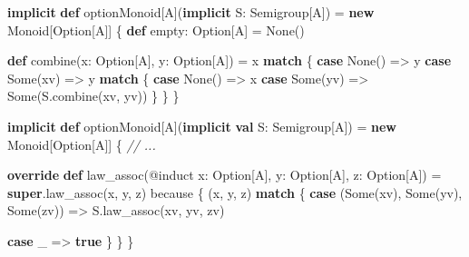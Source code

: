 \documentclass[
  ignorenonframetext,
]{beamer}
\newenvironment{Shaded}{}{}
\newcommand{\CommentTok}[1]{\textcolor[rgb]{0.38,0.63,0.69}{\textit{#1}}}
\newcommand{\FunctionTok}[1]{\textcolor[rgb]{0.02,0.16,0.49}{#1}}
\newcommand{\KeywordTok}[1]{\textcolor[rgb]{0.00,0.44,0.13}{\textbf{#1}}}
\newcommand{\NormalTok}[1]{#1}
\begin{document}
\begin{frame}[fragile]

\begin{Shaded}
\begin{Highlighting}[]
\KeywordTok{implicit} \KeywordTok{def}\NormalTok{ optionMonoid[A](}\KeywordTok{implicit}\NormalTok{ S: Semigroup[A]) =}
  \KeywordTok{new}\NormalTok{ Monoid[Option[A]] \{}
    \KeywordTok{def}\NormalTok{ empty: Option[A] = None()}

    \KeywordTok{def} \FunctionTok{combine}\NormalTok{(x: Option[A], y: Option[A]) =}
\NormalTok{      x }\KeywordTok{match}\NormalTok{ \{}
        \KeywordTok{case}\NormalTok{ None()   => y}
        \KeywordTok{case}\NormalTok{ Some(xv) => y }\KeywordTok{match}\NormalTok{ \{}
          \KeywordTok{case}\NormalTok{ None()   => x}
          \KeywordTok{case}\NormalTok{ Some(yv) => Some(S.}\FunctionTok{combine}\NormalTok{(xv, yv))}
\NormalTok{        \}}
\NormalTok{      \}}
\NormalTok{  \}}
\end{Highlighting}
\end{Shaded}

\end{frame}

\begin{frame}[fragile]

\begin{Shaded}
\begin{Highlighting}[]
\KeywordTok{implicit} \KeywordTok{def}\NormalTok{ optionMonoid[A](}\KeywordTok{implicit} \KeywordTok{val}\NormalTok{ S: Semigroup[A]) =}
  \KeywordTok{new}\NormalTok{ Monoid[Option[A]] \{}
    \CommentTok{// ...}

    \KeywordTok{override} \KeywordTok{def} \FunctionTok{law_assoc}\NormalTok{(@induct x: Option[A], y: Option[A], z: Option[A]) =}
      \KeywordTok{super}\NormalTok{.}\FunctionTok{law_assoc}\NormalTok{(x, y, z) because \{}
\NormalTok{        (x, y, z) }\KeywordTok{match}\NormalTok{ \{}
          \KeywordTok{case}\NormalTok{ (Some(xv), Some(yv), Some(zv)) =>}
\NormalTok{            S.}\FunctionTok{law_assoc}\NormalTok{(xv, yv, zv)}

          \KeywordTok{case}\NormalTok{ _ => }\KeywordTok{true}
\NormalTok{        \}}
\NormalTok{      \}}
\NormalTok{  \}}
\end{Highlighting}
\end{Shaded}

\end{frame}
\end{document}

